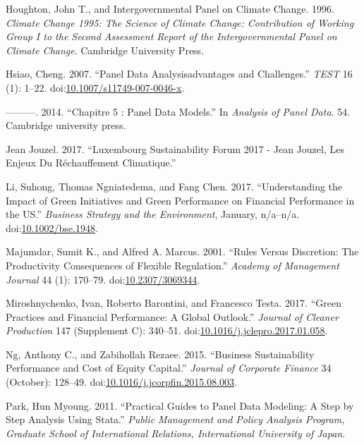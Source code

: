 \documentclass[12pt,]{article}
\begin{document}
\hypertarget{ref-HoughtonClimateChange19951996}{}
Houghton, John T., and Intergovernmental Panel on Climate Change. 1996.
\emph{Climate Change 1995: The Science of Climate Change: Contribution
of Working Group I to the Second Assessment Report of the
Intergovernmental Panel on Climate Change}. Cambridge University Press.

\hypertarget{ref-Hsiao2007}{}
Hsiao, Cheng. 2007. ``Panel Data Analysisadvantages and Challenges.''
\emph{TEST} 16 (1): 1--22.
doi:\href{https://doi.org/10.1007/s11749-007-0046-x}{10.1007/s11749-007-0046-x}.

\hypertarget{ref-HsiaoChapitrePanelData2014}{}
---------. 2014. ``Chapitre 5 : Panel Data Models.'' In \emph{Analysis
of Panel Data}. 54. Cambridge university press.

\hypertarget{ref-JeanJouzel2017}{}
Jean Jouzel. 2017. ``Luxembourg Sustainability Forum 2017 - Jean Jouzel,
Les Enjeux Du Réchauffement Climatique.''

\hypertarget{ref-LiUnderstandingImpactGreen2017}{}
Li, Suhong, Thomas Ngniatedema, and Fang Chen. 2017. ``Understanding the
Impact of Green Initiatives and Green Performance on Financial
Performance in the US.'' \emph{Business Strategy and the Environment},
January, n/a--n/a.
doi:\href{https://doi.org/10.1002/bse.1948}{10.1002/bse.1948}.

\hypertarget{ref-MajumdarRulesDiscretionProductivity2001}{}
Majumdar, Sumit K., and Alfred A. Marcus. 2001. ``Rules Versus
Discretion: The Productivity Consequences of Flexible Regulation.''
\emph{Academy of Management Journal} 44 (1): 170--79.
doi:\href{https://doi.org/10.2307/3069344}{10.2307/3069344}.

\hypertarget{ref-MiroshnychenkoGreenpracticesfinancial2017}{}
Miroshnychenko, Ivan, Roberto Barontini, and Francesco Testa. 2017.
``Green Practices and Financial Performance: A Global Outlook.''
\emph{Journal of Cleaner Production} 147 (Supplement C): 340--51.
doi:\href{https://doi.org/10.1016/j.jclepro.2017.01.058}{10.1016/j.jclepro.2017.01.058}.

\hypertarget{ref-Ng2015}{}
Ng, Anthony C., and Zabihollah Rezaee. 2015. ``Business Sustainability
Performance and Cost of Equity Capital.'' \emph{Journal of Corporate
Finance} 34 (October): 128--49.
doi:\href{https://doi.org/10.1016/j.jcorpfin.2015.08.003}{10.1016/j.jcorpfin.2015.08.003}.

\hypertarget{ref-Park2011}{}
Park, Hun Myoung. 2011. ``Practical Guides to Panel Data Modeling: A
Step by Step Analysis Using Stata.'' \emph{Public Management and Policy
Analysis Program, Graduate School of International Relations,
International University of Japan}.
\end{document}
